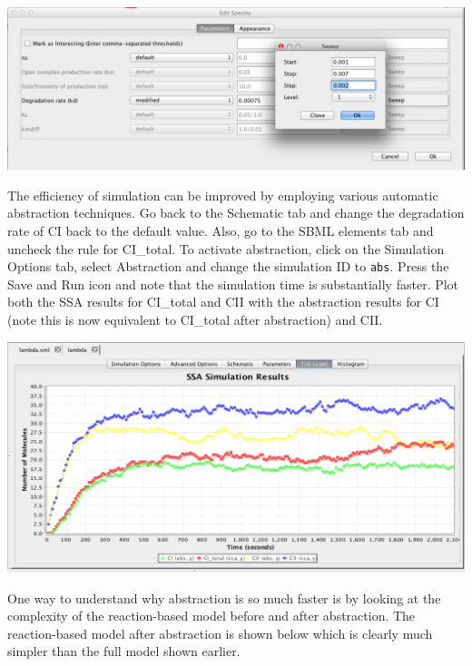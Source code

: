 \documentclass[titlepage,11pt]{article}
\begin{document}
\begin{center}
\includegraphics[width=160mm]{screenshots/sweep}
\end{center}

The efficiency of simulation can be improved by employing various automatic abstraction techniques.  Go back to the Schematic tab and change the degradation rate of CI back to the default value.  Also, go to the SBML elements tab and uncheck the rule for CI\_total.  To activate abstraction, click on the Simulation Options tab, select Abstraction and change the simulation ID to {\tt abs}.  Press the Save and Run icon and note that the simulation time is substantially faster.  Plot both the SSA results for CI\_total and CII with the abstraction results for CI (note this is now equivalent to CI\_total after abstraction) and CII.

\begin{center}
\includegraphics[width=160mm]{screenshots/absResults}
\end{center}

One way to understand why abstraction is so much faster is by looking at the complexity of the reaction-based model before and after abstraction.  The reaction-based model after abstraction is shown below which is clearly much simpler than the full model shown earlier.
\end{document}
